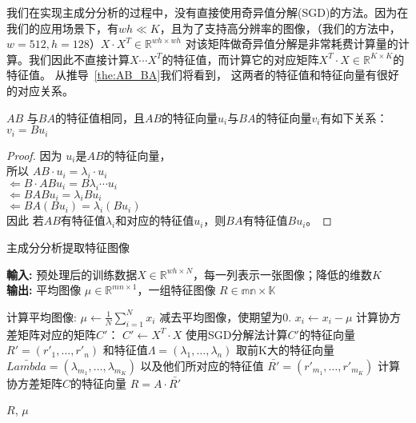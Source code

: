         我们在实现主成分分析的过程中，没有直接使用奇异值分解(SGD)的方法。因为在我们的应用场景下，有$wh \ll K$，且为了支持高分辨率的图像，（我们的方法中，$w = 512, h = 128$）$X\cdot X^T \in \mathbb{R}^{wh \times wh}$ 对该矩阵做奇异值分解是非常耗费计算量的计算。我们因此不直接计算$X\cdots  X^T$的特征值，而计算它的对应矩阵$X^T \cdot X \in \mathbb{R} ^{K \times K}$的特征值。 从推导~\ref{the:AB_BA}我们将看到， 这两者的特征值和特征向量有很好的对应关系。

        \begin{theorem}\label{the:AB_BA}
            $AB$ 与$BA$的特征值相同，且$AB$的特征向量$u_i$与$BA$的特征向量$v_i$有如下关系：$v_i = Bu_i$
        \end{theorem}
        \begin{proof}
        
            因为 $u_i$是$AB$的特征向量，\\
            所以  $AB \cdot u_i = \lambda_i \cdot u_i$\\
            $\Leftarrow B\cdot AB u_i = B \lambda_i \cdots u_i$\\
            $\Leftarrow BAB u_i = \lambda_i B u_i$\\
            $\Leftarrow BA(Bu_i)= \lambda_i (Bu_i)$\\
            因此 若$AB$有特征值$\lambda_i$和对应的特征值$u_i$，则$BA$有特征值$Bu_i$。
        
        \end{proof}


        \begin{algorithm}[t]
        \caption{主成分分析提取特征图像} %
        \hspace*{0.02in} {\bf 輸入:} %
        预处理后的训练数据$X \in \mathbb{R}^{wh \times N}$，每一列表示一张图像；降低的维数$K$ \\
        \hspace*{0.02in} {\bf 输出:} %
        平均图像 $\mu \in \mathbb{R}^{mn\times 1}$，一组特征图像 $R \in \mathbb {mn \times K}$
        \begin{algorithmic}[1]
        \State 计算平均图像: $\mu \leftarrow \frac{1}{N} \sum_{i=1}^N x_i$ %
        \State 减去平均图像，使期望为0. $x_i \leftarrow x_i - \mu$
        \State 计算协方差矩阵对应的矩阵$C'$： $C' \leftarrow X^T \cdot X$
        \State 使用SGD分解法计算$C'$的特征向量 $R' = (r'_1, \dots, r'_n)$ 和特征值$\Lambda = (\lambda_1, \dots, \lambda_n)$
        \State 取前K大的特征向量 $\bar{Lambda} = (\lambda_{m_1}, \dots, \lambda_{m_K})$ 以及他们所对应的特征值 $\bar {R'} = (r'_{m_1}, \dots, r'_{m_K})$
        \State 计算协方差矩阵$C$的特征向量 $R = A \cdot \bar{R'}$

        \State \Return $R$, $\mu$
        \end{algorithmic}
        \label{alg:eigenOCT}
        \end {algorithm}


